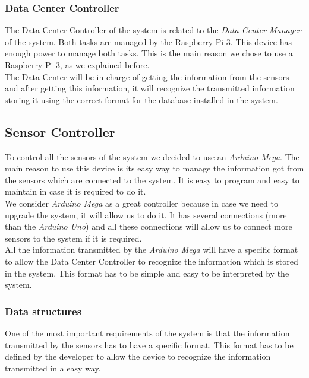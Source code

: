 \subsubsection{Data Center Controller}

The Data Center Controller of the system is related to the \textit{Data Center Manager} of the system. Both tasks are managed by the Raspberry Pi 3. This device has enough power to manage both tasks. This is the main reason we chose to use a Raspberry Pi 3, as we explained before.\\

The Data Center will be in charge of getting the information from the sensors and after getting this information, it will recognize the transmitted information storing it using the correct format for the database installed in the system.

\subsection{Sensor Controller}

To control all the sensors of the system we decided to use an \textit{Arduino Mega}. The main reason to use this device is its easy way to manage the information got from the sensors which are connected to the system. It is easy to program and easy to maintain in case it is required to do it.\\

We consider \textit{Arduino Mega} as a great controller because in case we need to upgrade the system, it will allow us to do it. It has several connections (more than the \textit{Arduino Uno}) and all these connections will allow us to connect more sensors to the system if it is required.\\

All the information transmitted by the \textit{Arduino Mega} will have a specific format to allow the Data Center Controller to recognize the information which is stored in the system. This format has to be simple and easy to be interpreted by the system.

\subsubsection{Data structures}

One of the most important requirements of the system is that the information transmitted by the sensors has to have a specific format. This format has to be defined by the developer to allow the device to recognize the information transmitted in a easy way.\\

